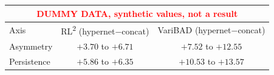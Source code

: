 \begin{tabular}{lcc}
\toprule
\multicolumn{3}{c}{\textcolor{red}{\footnotesize DUMMY DATA, synthetic values, not a result}} \\
\hline
Axis & RL\textsuperscript{2} (hypernet$-$concat) & VariBAD (hypernet$-$concat) \\
\midrule
Asymmetry & $+3.70$ to $+6.71$ & $+7.52$ to $+12.55$ \\
\midrule
Persistence & $+5.86$ to $+6.35$ & $+10.53$ to $+13.57$ \\
\bottomrule
\end{tabular}
